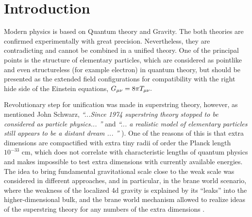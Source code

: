 \documentclass[aps,prd,twocolumn,showpacs]{revtex4}
\begin{document}
 \maketitle

\maketitle

\newpage

\bigskip
\section{Introduction}
Modern physics is based on Quantum theory and Gravity. The both theories are confirmed
experimentally with great precision. Nevertheless, they are contradicting and cannot be combined in
a unified theory. One of the principal points is the structure of elementary particles, which are
considered as pointlike and even structureless (for example electron) in  quantum theory, but
should be presented as the extended field configurations for compatibility with the right hide side
of the Einstein equations, $G_{\mu\nu} = 8\pi T_{\mu\nu} .$

Revolutionary step for unification was made in superstring theory, however, as mentioned John
Schwarz, \emph{``...Since 1974 superstring theory stopped to be considered as particle physics...
''}  and \emph{``... a realistic model of elementary particles still appears to be a distant dream
... ''}  \cite{Schw}). One of the reasons of this is that extra dimensions are compactified with
extra tiny radii of order the Planck length $10^{-33}$ cm, which does not correlate with
characteristic lengths of quantum physics and  makes impossible to test extra dimensions with
currently available energies. The idea to bring  fundamental gravitational scale close to the weak
scale was considered in different approaches, and in particular, in the brane world scenario, where
the weakness of the localized 4d gravity is explained by its ``leaks'' into the higher-dimensional
bulk, and the brane world mechanism  allowed to realize ideas of the superstring theory for any
numbers of the extra dimensions \cite{DvalBW}.
\end{document}
